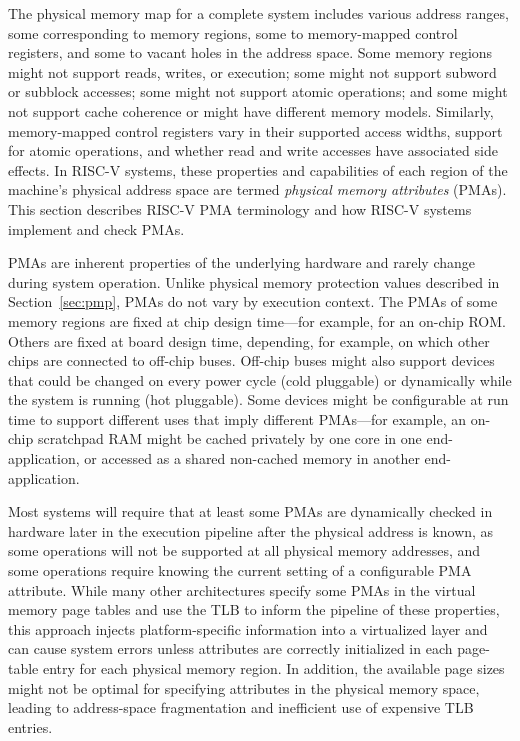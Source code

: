 The physical memory map for a complete system includes various address
ranges, some corresponding to memory regions, some to memory-mapped
control registers, and some to vacant holes in the address space.  Some
memory regions might not support reads, writes, or execution; some
might not support subword or subblock accesses; some might not support
atomic operations; and some might not support cache coherence or might
have different memory models.  Similarly, memory-mapped control
registers vary in their supported access widths, support for atomic
operations, and whether read and write accesses have associated side
effects.  In RISC-V systems, these properties and capabilities of each
region of the machine's physical address space are termed {\em
  physical memory attributes} (PMAs).  This section describes RISC-V
PMA terminology and how RISC-V systems implement and check PMAs.

PMAs are inherent properties of the underlying hardware and rarely
change during system operation.  Unlike physical memory protection
values described in Section~\ref{sec:pmp}, PMAs do not vary by
execution context.  The PMAs of some memory regions are fixed at chip
design time---for example, for an on-chip ROM.  Others are fixed at
board design time, depending, for example, on which other chips are
connected to off-chip buses.  Off-chip buses might also support
devices that could be changed on every power cycle (cold pluggable) or
dynamically while the system is running (hot pluggable).  Some devices
might be configurable at run time to support different uses that imply
different PMAs---for example, an on-chip scratchpad RAM might be
cached privately by one core in one end-application, or accessed as a
shared non-cached memory in another end-application.

Most systems will require that at least some PMAs are dynamically
checked in hardware later in the execution pipeline after the physical
address is known, as some operations will not be supported at all
physical memory addresses, and some operations require knowing the
current setting of a configurable PMA attribute.  While many other architectures
specify some PMAs in the virtual memory page tables and use the TLB to
inform the pipeline of these properties, this approach injects platform-specific
information into a virtualized layer and can cause system errors
unless attributes are correctly initialized in each page-table entry
for each physical memory region.  In addition, the available
page sizes might not be optimal for specifying attributes in the
physical memory space, leading to address-space fragmentation and
inefficient use of expensive TLB entries.

